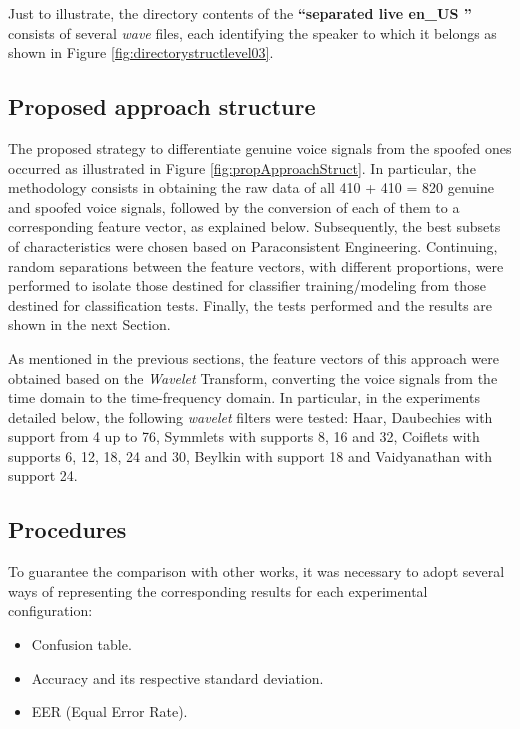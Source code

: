 		\par Just to illustrate, the directory contents of the \textbf{``separated \textfractionsolidus live \textfractionsolidus en\_US ''} consists of several \textit{wave} files, each identifying the speaker to which it belongs as shown in Figure \ref{fig:directorystructlevel03}.
	
	\subsection{Proposed approach structure}
		\par The proposed strategy to differentiate genuine voice signals from the spoofed ones occurred as illustrated in Figure \ref{fig:propApproachStruct}. In particular, the methodology consists in obtaining the raw data of all 410 + 410 = 820 genuine and spoofed voice signals, followed by the conversion of each of them to a corresponding feature vector, as explained below. Subsequently, the best subsets of characteristics were chosen based on Paraconsistent Engineering. Continuing, random separations between the feature vectors, with different proportions, were performed to isolate those destined for classifier training/modeling from those destined for classification tests. Finally, the tests performed and the results are shown in the next Section.
		
		
		
		\par As mentioned in the previous sections, the feature vectors of this approach were obtained based on the \textit{Wavelet} Transform, converting the voice signals from the time domain to the time-frequency domain. In particular, in the experiments detailed below, the following \textit{wavelet} filters were tested: Haar, Daubechies with support from 4 up to 76, Symmlets with supports 8, 16 and 32, Coiflets with supports 6, 12, 18, 24 and 30, Beylkin with support 18 and Vaidyanathan with support 24.

	\subsection{Procedures}
	
		\par To guarantee the comparison with other works, it was necessary to adopt several ways of representing the corresponding results for each experimental configuration:
	
		\begin{itemize}
			\item Confusion table.
			\item Accuracy and its respective standard deviation.
			\item EER (Equal Error Rate).
		\end{itemize}
	
